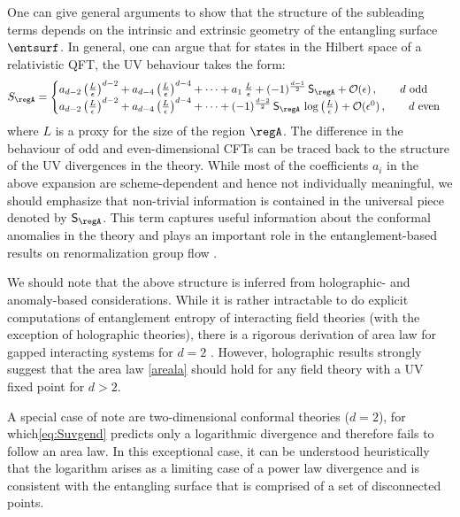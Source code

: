 \documentclass[12pt,openany]{book}
\begin{document}
One can give general arguments to show that the structure of the subleading terms depends on the intrinsic and extrinsic geometry of the entangling surface $\entsurf$. In general, one can argue that for states in the Hilbert space of a relativistic QFT, the UV behaviour takes the form:
%
\begin{align}
S_\regA =
\begin{cases}
a_{d-2} \left(\frac{L}{\epsilon}\right)^{d-2} + a_{d-4} \left(\frac{L}{\epsilon}\right)^{d-4} + \cdots +
a_1\, \frac{L}{\epsilon} + (-1)^{\frac{d-1}{2}} \,  {\sf S}_\regA + {\cal O}(\epsilon)
\,, \qquad d  \ \text{odd} \\
a_{d-2} \left(\frac{L}{\epsilon}\right)^{d-2} + a_{d-4} \left(\frac{L}{\epsilon}\right)^{d-4} + \cdots
+ (-1)^{\frac{d-2}{2}} \, {\sf S}_\regA \, \log\left(\frac{L}{\epsilon}\right) + {\cal O}(\epsilon^0) \,, \qquad d \ \text{even}
\end{cases}
\label{eq:Suvgend}
\end{align}
%
where $L$ is a proxy for the size of the region $\regA$.
The difference in the behaviour of odd and even-dimensional CFTs can be traced back to the structure of the UV divergences in the theory. While most of the coefficients $a_i$ in the above expansion are scheme-dependent and hence not individually meaningful, we should emphasize that non-trivial information is contained in the universal piece denoted by $\sf{S}_\regA$. This term captures useful information about the conformal anomalies in the theory and plays an important role in the entanglement-based results on renormalization group flow \cite{Casini:2004bw,Myers:2010tj,Jafferis:2011zi,Liu:2012eea,Casini:2012ei}. 

We should note that the above structure is inferred from holographic- and anomaly-based considerations. While it is rather intractable to do explicit computations of entanglement entropy of interacting field theories (with the exception of holographic theories), there is a rigorous derivation of area law for gapped interacting systems for $d=2$ \cite{Hastings:2007aa}.   However, holographic results strongly suggest that the area law \eqref{areala} should hold for any field theory with a UV fixed point for $d>2$.

A special case of note are two-dimensional conformal theories ($d=2$),  for which\eqref{eq:Suvgend} predicts only a  logarithmic divergence and therefore fails to follow an area law. In this exceptional case, it can be understood heuristically that the logarithm arises as a limiting case of a power law divergence and is consistent with the entangling surface that is comprised of a set of disconnected points.
\end{document}
